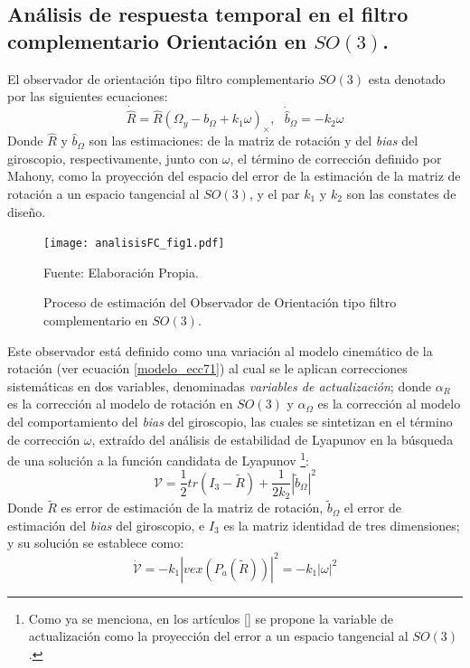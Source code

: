 \documentclass[10pt]{report}
\numberwithin{equation}{chapter}
\numberwithin{algorithm}{chapter}
\newcommand{\bcite}[1]{[\cite{#1}]}
\newcommand{\lypf}{\mathcal{V}}
\newcommand{\lucia}{vex(P_a(\tilde{R}))}
\newcommand{\bias}{\emph{bias} }
\begin{document}
\subsection{Análisis de respuesta temporal en el filtro complementario Orientación en $SO(3)$.}\label{sec_epsilon}
El observador de orientación tipo filtro complementario $SO(3)$ esta denotado por las siguientes ecuaciones:
\begin{equation}\label{FConSO3_ecc1}
\dot{\hat{R}}=\hat{R}(\Omega_y-b_\Omega+k_1\omega)_\times,~~~\dot{\hat{b}}_\Omega=-k_2\omega
\end{equation}
Donde $\hat{R}$ y $\hat{b}_\Omega$ son las estimaciones: de la matriz de rotación y del \emph{bias} del giroscopio, respectivamente, junto con $\omega$, el término de corrección definido por Mahony, como la proyección del espacio del error de la estimación de la matriz de rotación a un espacio tangencial al $SO(3)$, y el par $k_1$ y $k_2$ son las constates de diseño. \par
\begin{figure}
\center
\texttt{[image: analisisFC\_fig1.pdf]}
\caption{Proceso de estimación del Observador de Orientación tipo filtro complementario en $SO(3)$.}
\scriptsize{Fuente: Elaboración Propia.}
\label{analisisFC_fig1}
\end{figure} 
Este observador está definido como una variación al modelo cinemático de la rotación (ver ecuación \eqref{modelo_ecc71}) al cual se le aplican correcciones sistemáticas en dos variables, denominadas \emph{variables de actualización}; donde $\alpha_R$ es la corrección al modelo de rotación en $SO(3)$ y $\alpha_\Omega$ es la corrección al modelo del comportamiento del \bias del giroscopio, las cuales se sintetizan en el término de corrección $\omega$, extraído del análisis de estabilidad de Lyapunov en la búsqueda de una solución a la función candidata de Lyapunov \footnote{Como ya se menciona, en los artículos \bcite{Mahony2005,Mahony2006} se propone la variable de actualización como la proyección del error a un espacio tangencial al $SO(3)$.}:
\begin{equation}
\lypf=\frac{1}{2}tr(I_3-\tilde{R})+\frac{1}{2k_2}|\tilde{b}_\Omega|^2
\end{equation}
Donde $\tilde{R}$ es error de estimación de la matriz de rotación, $\tilde{b}_\Omega$ el error de estimación del \emph{bias} del giroscopio, e $I_3$ es la matriz identidad de tres dimensiones; y su solución se establece como:
\begin{equation}\label{FConSO3_ecc2}
\dot{\lypf}=-k_1|\lucia|^2=-k_1|\omega|^2
\end{equation}
\end{document}
